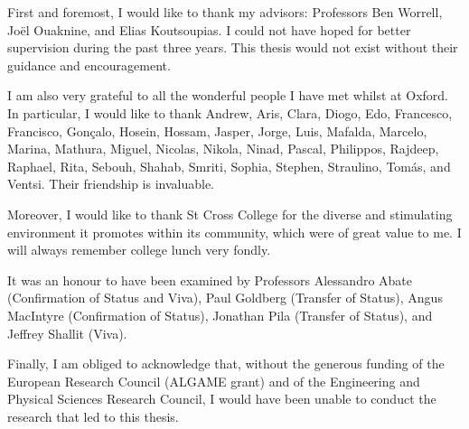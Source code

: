 \begin{acknowledgements}
First and foremost, I would like to thank my advisors: Professors Ben Worrell, Jo\"{e}l Ouaknine, and Elias Koutsoupias. I could not have hoped for better supervision during the past three years. This thesis would not exist without their guidance and encouragement.

I am also very grateful to all the wonderful people I have met whilst at Oxford. In particular, I would like to thank Andrew, Aris, Clara, Diogo, Edo, Francesco, Francisco, Gon\c{c}alo, Hosein, Hossam, Jasper, Jorge, Luis, Mafalda, Marcelo, Marina, Mathura, Miguel, Nicolas, Nikola, Ninad, Pascal, Philippos, Rajdeep, Raphael, Rita, Sebouh, Shahab, Smriti, Sophia, Stephen, Straulino, Tom\'{a}s, and Ventsi. Their friendship is invaluable.

Moreover, I would like to thank St Cross College for the diverse and stimulating environment it promotes within its community, which were of great value to me. I will always remember college lunch very fondly.

It was an honour to have been examined by Professors Alessandro Abate (Confirmation of Status and Viva), Paul Goldberg (Transfer of Status), Angus MacIntyre (Confirmation of Status), Jonathan Pila (Transfer of Status), and Jeffrey Shallit (Viva).

Finally, I am obliged to acknowledge that, without the generous funding of the European Research Council (ALGAME grant) and of the Engineering and Physical Sciences Research Council, I would have been unable to conduct the research that led to this thesis.
\end{acknowledgements}
